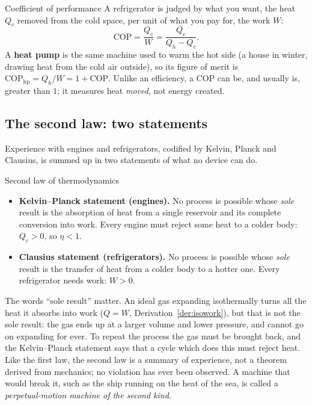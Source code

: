 \begin{defbox}{Coefficient of performance}
A refrigerator is judged by what you want, the heat $Q_c$ removed from the cold space, per unit of what
you pay for, the work $W$:
\[
\text{COP}=\frac{Q_c}{W}=\frac{Q_c}{Q_h-Q_c}.
\]
A \textbf{heat pump} is the same machine used to warm the hot side (a house in winter, drawing heat from the
cold air outside), so its figure of merit is $\text{COP}_{\text{hp}}=Q_h/W=1+\text{COP}$. Unlike an
efficiency, a COP can be, and usually is, greater than $1$; it measures heat \emph{moved}, not energy
created.
\end{defbox}

\subsection{The second law: two statements}

Experience with engines and refrigerators, codified by Kelvin, Planck and Clausius, is summed up in two
statements of what no device can do.

\begin{defbox}{Second law of thermodynamics}\label{def:secondlaw}
\begin{itemize}
\item \textbf{Kelvin--Planck statement (engines).} No process is possible whose \emph{sole} result is the
      absorption of heat from a single reservoir and its complete conversion into work. Every engine must
      reject some heat to a colder body: $Q_c>0$, so $\eta<1$.
\item \textbf{Clausius statement (refrigerators).} No process is possible whose \emph{sole} result is the
      transfer of heat from a colder body to a hotter one. Every refrigerator needs work: $W>0$.
\end{itemize}
\end{defbox}

The words ``sole result'' matter. An ideal gas expanding isothermally turns all the heat it absorbs into
work ($Q=W$, Derivation~\ref{der:isowork}), but that is not the sole result: the gas ends up at a larger
volume and lower pressure, and cannot go on expanding for ever. To repeat the process the gas must be
brought back, and the Kelvin--Planck statement says that a cycle which does this must reject heat. Like
the first law, the second law is a summary of experience, not a theorem derived from mechanics; no
violation has ever been observed. A machine that would break it, such as the ship running on the heat of
the sea, is called a \emph{perpetual-motion machine of the second kind}.

